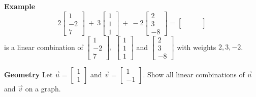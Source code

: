   \begin{frame}[fragile]
\textbf{Example}
\[
 2\left[\begin{array}{r}1 \\-2 \\ 7  \end{array}\right]\ 
 + \ 3\left[\begin{array}{r} 1 \\ 1 \\ 1 \end{array}\right] \ 
 + \ -2\left[\begin{array}{r}2 \\ 3 \\ -8  \end{array}\right]
 = \left[\begin{array}{r}\qquad  \\ \qquad \\ \qquad \end{array}\right] \]     
is a linear combination of $ \left[\begin{array}{r}1 \\-2 \\ 7  \end{array}\right],$ $\left[\begin{array}{r} 1 \\ 1 \\ 1 \end{array}\right]$ and $\left[\begin{array}{r}2 \\ 3 \\ -8  \end{array}\right]$ with weights $2,3 ,-2$.


\textbf{Geometry} 
Let $\vec{u} = \left[\begin{array}{r} 1 \\ 1 \end{array}\right]$ and 
$\vec{v} = \left[\begin{array}{r} 1 \\ -1 \end{array}\right]$.  Show all
linear combinations of $\vec{u}$ and $\vec{v}$ on a graph.

\end{frame}

